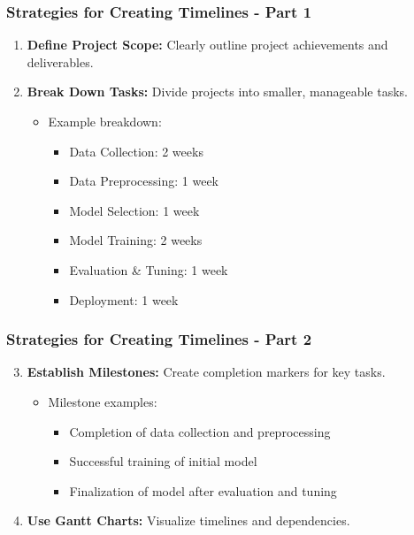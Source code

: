 \documentclass[aspectratio=169]{beamer}
\begin{document}
\begin{frame}[fragile]
    \frametitle{Strategies for Creating Timelines - Part 1}
    \begin{enumerate}
        \item \textbf{Define Project Scope:} Clearly outline project achievements and deliverables.
        \item \textbf{Break Down Tasks:} Divide projects into smaller, manageable tasks. 
            \begin{itemize}
                \item Example breakdown:
                \begin{itemize}
                    \item Data Collection: 2 weeks
                    \item Data Preprocessing: 1 week
                    \item Model Selection: 1 week
                    \item Model Training: 2 weeks
                    \item Evaluation \& Tuning: 1 week
                    \item Deployment: 1 week
                \end{itemize}
            \end{itemize}
    \end{enumerate}
\end{frame}

\begin{frame}[fragile]
    \frametitle{Strategies for Creating Timelines - Part 2}
    \begin{enumerate}
        \setcounter{enumi}{2}  %
        \item \textbf{Establish Milestones:} Create completion markers for key tasks.
            \begin{itemize}
                \item Milestone examples:
                \begin{itemize}
                    \item Completion of data collection and preprocessing
                    \item Successful training of initial model
                    \item Finalization of model after evaluation and tuning
                \end{itemize}
            \end{itemize}
        \item \textbf{Use Gantt Charts:} Visualize timelines and dependencies.
    \end{enumerate}
\end{frame}
\end{document}
